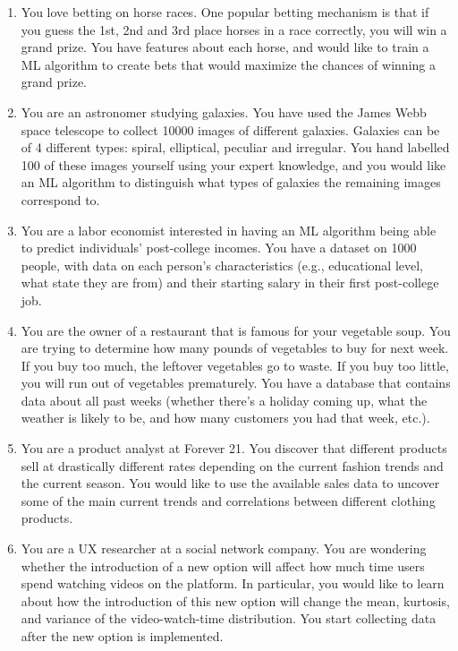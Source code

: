 \documentclass{exam}
\begin{document}
\begin{enumerate}

    \item You love betting on horse races. One popular betting mechanism is that if you guess the 1st, 2nd and 3rd place horses in a race correctly, you will win a grand prize. You have features about each horse, and would like to train a ML algorithm to create bets that would maximize the chances of winning a grand prize. 
    \item You are an astronomer studying galaxies. You have used the James Webb space telescope to collect 10000 images of different galaxies. Galaxies can be of 4 different types: spiral, elliptical, peculiar and irregular. You hand labelled 100 of these images yourself using your expert knowledge, and you would like an ML algorithm to distinguish what types of galaxies the remaining images correspond to. 
    \item You are a labor economist interested in having an ML algorithm being able to predict individuals' post-college incomes. You have a dataset on 1000 people, with data on each person's characteristics (e.g., educational level, what state they are from) and their starting salary in their first post-college job. 
    \item You are the owner of a restaurant that is famous for your vegetable soup. You are trying to determine how many pounds of vegetables to buy for next week. If you buy too much, the leftover vegetables go to waste. If you buy too little, you will run out of vegetables prematurely. You have a database that contains data about all past weeks (whether there's a holiday coming up, what the weather is likely to be, and how many customers you had that week, etc.).
    \item You are a product analyst at Forever 21. You discover that different products sell at drastically different rates depending on the current fashion trends and the current season. You would like to use the available sales data to uncover some of the main current trends and correlations between different clothing products.  
    \item You are a UX researcher at a social network company. You are wondering whether the introduction of a new option will affect how much time users spend watching videos on the platform. In particular, you would like to learn about how the introduction of this new option will change the mean, kurtosis, and variance of the video-watch-time distribution. You start collecting data after the new option is implemented.

\end{enumerate}
\end{document}

